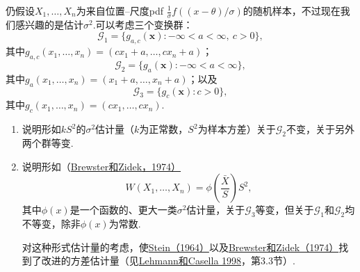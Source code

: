 \begin{exercise}\label{exercise:6.43}
仍假设$X_1,\ldots,X_n$为来自位置--尺度pdf $\frac1\sigma f((x-\theta)/\sigma)$的随机样本，不过现在我们感兴趣的是估计$\sigma^2$.可以考虑三个变换群：
$$\mathcal G_1=\{g_{a,c}(\boldsymbol x):-\infty<a<\infty,\ c>0\},$$
其中$g_{a,c}(x_1,\ldots,x_n)=(cx_1+a,\ldots,cx_n+a)$；
$$\mathcal G_2=\{g_a(\boldsymbol x):-\infty<a<\infty\},$$
其中$g_a(x_1,\ldots,x_n)=(x_1+a,\ldots,x_n+a)$；以及
$$\mathcal G_3=\{g_c(\boldsymbol x):c>0\},$$
其中$g_c(x_1,\ldots,x_n)=(cx_1,\ldots,cx_n)$.
\begin{enumerate}[label=(\alph*)]
\item 说明形如$kS^2$的$\sigma^2$估计量（$k$为正常数，$S^2$为样本方差）关于$\mathcal G_2$不变，关于另外两个群等变.
\item 说明形如（\hyperref[bib:source48]{Brewster和Zidek，1974）}
$$W(X_1,\ldots,X_n)=\phi\left(\frac{\bar X}S\right)S^2,$$
其中$\phi(x)$是一个函数的、更大一类$\sigma^2$估计量，关于$\mathcal G_3$等变，但关于$\mathcal G_1$和$\mathcal G_2$均不等变，除非$\phi(x)$为常数.

对这种形式估计量的考虑，使\hyperref[bib:source302]{Stein（1964）}以及\hyperref[bib:source48]{Brewster和Zidek（1974）}找到了改进的方差估计量（见\hyperref[bib:source200]{Lehmann和Casella 1998}，第3.3节）.
\end{enumerate}
\end{exercise}
